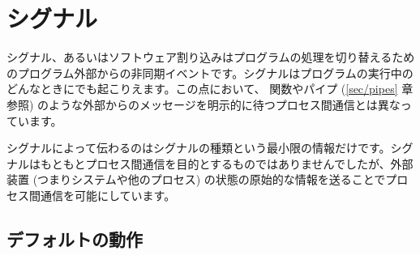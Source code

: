 %
%

\chapter{\label{sec/signals}シグナル}

シグナル、あるいはソフトウェア割り込みはプログラムの処理を切り替えるためのプログラム外部からの非同期イベントです。シグナルはプログラムの実行中のどんなときにでも起こりえます。この点において、  関数やパイプ (\ref{sec/pipes} 章参照) のような外部からのメッセージを明示的に待つプロセス間通信とは異なっています。

シグナルによって伝わるのはシグナルの種類という最小限の情報だけです。シグナルはもともとプロセス間通信を目的とするものではありませんでしたが、外部装置 (つまりシステムや他のプロセス) の状態の原始的な情報を送ることでプロセス間通信を可能にしています。

\section{デフォルトの動作}

